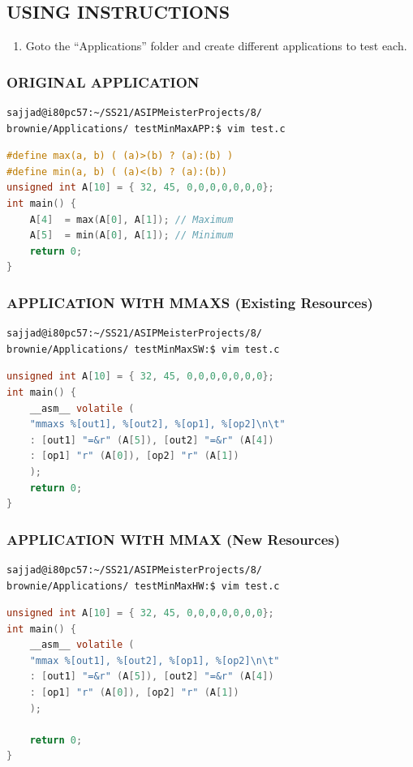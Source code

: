 \subsection{USING INSTRUCTIONS}
\begin{enumerate}[resume]
\item Goto the ``Applications'' folder and create different applications to
test each.
\end{enumerate}
\subsubsection{ORIGINAL APPLICATION}
\begin{lstlisting}
sajjad@i80pc57:~/SS21/ASIPMeisterProjects/8/
brownie/Applications/ testMinMaxAPP:$ vim test.c
\end{lstlisting}
\begin{lstlisting}[language=C,caption={"test.c using original"},captionpos=t]
#define max(a, b) ( (a)>(b) ? (a):(b) )
#define min(a, b) ( (a)<(b) ? (a):(b))
unsigned int A[10] = { 32, 45, 0,0,0,0,0,0,0};
int main() {
	A[4]  = max(A[0], A[1]); // Maximum
	A[5]  = min(A[0], A[1]); // Minimum
	return 0;
}
\end{lstlisting}
\subsubsection{APPLICATION WITH MMAXS (Existing Resources)}
\begin{lstlisting}
sajjad@i80pc57:~/SS21/ASIPMeisterProjects/8/
brownie/Applications/ testMinMaxSW:$ vim test.c
\end{lstlisting}
\begin{lstlisting}[language=C,caption={"test.c using existing resources"},captionpos=t]
unsigned int A[10] = { 32, 45, 0,0,0,0,0,0,0};
int main() {
	__asm__ volatile (
	"mmaxs %[out1], %[out2], %[op1], %[op2]\n\t"
	: [out1] "=&r" (A[5]), [out2] "=&r" (A[4])
	: [op1] "r" (A[0]), [op2] "r" (A[1])
	);
	return 0;
}	
\end{lstlisting}
\subsubsection{APPLICATION WITH MMAX (New Resources)}
\begin{lstlisting}
sajjad@i80pc57:~/SS21/ASIPMeisterProjects/8/
brownie/Applications/ testMinMaxHW:$ vim test.c
\end{lstlisting}
\begin{lstlisting}[language=C,caption={"test.c using added resources"},captionpos=t]
unsigned int A[10] = { 32, 45, 0,0,0,0,0,0,0};
int main() {
	__asm__ volatile (
	"mmax %[out1], %[out2], %[op1], %[op2]\n\t"
	: [out1] "=&r" (A[5]), [out2] "=&r" (A[4])
	: [op1] "r" (A[0]), [op2] "r" (A[1])
	);
	
	return 0;
}
\end{lstlisting}
